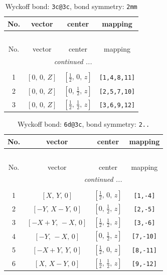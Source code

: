 \documentclass[fleqn,8pt]{jsarticle}
\begin{document}
\renewcommand{\arraystretch}{1.2}
\begin{longtable}{cccc}
\caption{Wyckoff bond: {\tt 3c@3c}, bond symmetry: {\tt 2mm}}
 \\
 \hline \hline
No. & vector & center & mapping \\ \hline \endfirsthead

\multicolumn{3}{l}{\tablename\ \thetable{}} \\
 \hline \hline
No. & vector & center & mapping \\ \hline \endhead

 \hline \hline
\multicolumn{3}{r}{\footnotesize\it continued ...} \\ \endfoot

 \hline \hline
\multicolumn{3}{r}{} \\ \endlastfoot

1 & $\left[ 0,\, 0,\, Z \right]$ & $\left[ \frac{1}{2},\, 0,\, z \right]$ & {\tt [1,4,8,11]} \\ \hline
2 & $\left[ 0,\, 0,\, Z \right]$ & $\left[ 0,\, \frac{1}{2},\, z \right]$ & {\tt [2,5,7,10]} \\ \hline
3 & $\left[ 0,\, 0,\, Z \right]$ & $\left[ \frac{1}{2},\, \frac{1}{2},\, z \right]$ & {\tt [3,6,9,12]} \\
\end{longtable}
\renewcommand{\arraystretch}{1.2}
\begin{longtable}{cccc}
\caption{Wyckoff bond: {\tt 6d@3c}, bond symmetry: {\tt 2..}}
 \\
 \hline \hline
No. & vector & center & mapping \\ \hline \endfirsthead

\multicolumn{3}{l}{\tablename\ \thetable{}} \\
 \hline \hline
No. & vector & center & mapping \\ \hline \endhead

 \hline \hline
\multicolumn{3}{r}{\footnotesize\it continued ...} \\ \endfoot

 \hline \hline
\multicolumn{3}{r}{} \\ \endlastfoot

1 & $\left[ X,\, Y,\, 0 \right]$ & $\left[ \frac{1}{2},\, 0,\, z \right]$ & {\tt [1,-4]} \\ \hline
2 & $\left[ - Y,\, X - Y,\, 0 \right]$ & $\left[ 0,\, \frac{1}{2},\, z \right]$ & {\tt [2,-5]} \\ \hline
3 & $\left[ - X + Y,\, - X,\, 0 \right]$ & $\left[ \frac{1}{2},\, \frac{1}{2},\, z \right]$ & {\tt [3,-6]} \\ \hline
4 & $\left[ - Y,\, - X,\, 0 \right]$ & $\left[ 0,\, \frac{1}{2},\, z \right]$ & {\tt [7,-10]} \\ \hline
5 & $\left[ - X + Y,\, Y,\, 0 \right]$ & $\left[ \frac{1}{2},\, 0,\, z \right]$ & {\tt [8,-11]} \\ \hline
6 & $\left[ X,\, X - Y,\, 0 \right]$ & $\left[ \frac{1}{2},\, \frac{1}{2},\, z \right]$ & {\tt [9,-12]} \\
\end{longtable}
\end{document}
